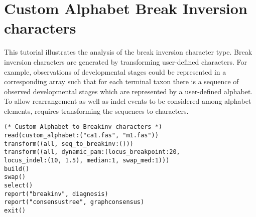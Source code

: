 \section{Custom Alphabet Break Inversion characters}{\label{tutorial 8}}

This tutorial illustrates the analysis of the break inversion character type.  Break inversion characters are generated by transforming user-defined  characters.  
For example, observations of developmental stages could be represented in a corresponding array such that for each terminal taxon there is a sequence of observed developmental stages which are represented by a user-defined alphabet.  To allow rearrangement as well as indel events to be considered among alphabet elements, requires transforming the  sequences to  characters. 

\begin{verbatim}
(* Custom Alphabet to Breakinv characters *)
read(custom_alphabet:("ca1.fas", "m1.fas"))
transform((all, seq_to_breakinv:()))
transform((all, dynamic_pam:(locus_breakpoint:20,
locus_indel:(10, 1.5), median:1, swap_med:1)))
build()
swap()
select()
report("breakinv", diagnosis)
report("consensustree", graphconsensus)
exit()
\end{verbatim}

